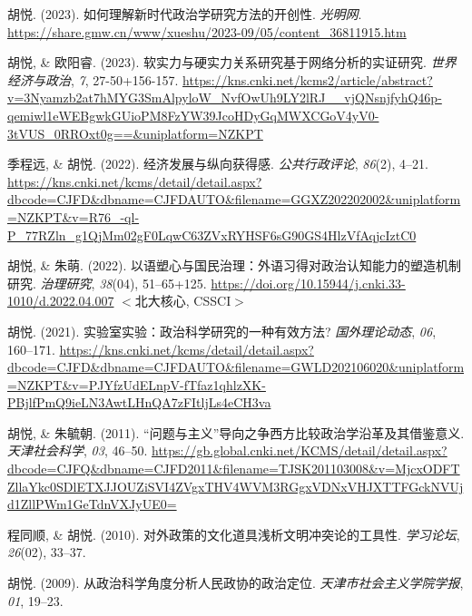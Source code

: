 \documentclass[
  12pt,
]
{article}
\newlength{\cslhangindent}
\newlength{\cslentryspacingunit} %
\newenvironment{CSLReferences}[2] %
 {%
  \setlength{\parindent}{0pt}
  \ifodd #1
  \let\oldpar\par
  \def\par{\hangindent=\cslhangindent\oldpar}
  \fi
  \setlength{\parskip}{#2\cslentryspacingunit}
 }%
 {}
\newcommand{\CSLBlock}[1]{#1\hfill\break}
\begin{document}
\hypertarget{refs-chinese}{}
\begin{CSLReferences}{1}{0}
\leavevmode{}%
胡悦. (2023). {如何理解新时代政治学研究方法的开创性}. \emph{光明网}.
\url{https://share.gmw.cn/www/xueshu/2023-09/05/content_36811915.htm}

\leavevmode{}%
胡悦, \& 欧阳睿. (2023).
{软实力与硬实力关系研究{\textemdash}{\textemdash}基于网络分析的实证研究}.
\emph{世界经济与政治}, \emph{7}, 27-50+156-157.
\url{https://kns.cnki.net/kcms2/article/abstract?v=3Nyamzb2at7hMYG3SmAlpyloW_NvfOwUh9LY2lRJ__vjQNsnjfyhQ46p-qemiwl1eWEBgwkGUioPM8FzYW39JcoHDyGqMWXCGoV4yV0-3tVUS_0RROxt0g==\&uniplatform=NZKPT}

\leavevmode{}%
季程远, \& 胡悦. (2022). 经济发展与纵向获得感. \emph{公共行政评论},
\emph{86}(2), 4--21.
\url{https://kns.cnki.net/kcms/detail/detail.aspx?dbcode=CJFD\&dbname=CJFDAUTO\&filename=GGXZ202202002\&uniplatform=NZKPT\&v=R76_-ql-P_77RZln_g1QjMm02gF0LqwC63ZVxRYHSF6sG90GS4HlzVfAqjcIztC0}

\leavevmode{}%
胡悦, \& 朱萌. (2022).
{以语塑心与国民治理：外语习得对政治认知能力的塑造机制研究}.
\emph{治理研究}, \emph{38}(04), 51--65+125.
\url{https://doi.org/10.15944/j.cnki.33-1010/d.2022.04.007}
\CSLBlock{{\(<\)}北大核心, CSSCI{\(>\)}}

\leavevmode{}%
胡悦. (2021). {实验室实验：政治科学研究的一种有效方法?}
\emph{国外理论动态}, \emph{06}, 160--171.
\url{https://kns.cnki.net/kcms/detail/detail.aspx?dbcode=CJFD\&dbname=CJFDAUTO\&filename=GWLD202106020\&uniplatform=NZKPT\&v=PJYfzUdELnpV-fTfaz1qhlzXK-PBjlfPmQ9ieLN3AwtLHnQA7zFItljLs4eCH3va}

\leavevmode{}%
胡悦, \& 朱毓朝. (2011).
{{``问题与主义''}导向之争{\textemdash}{\textemdash}西方比较政治学沿革及其借鉴意义}.
\emph{天津社会科学}, \emph{03}, 46--50.
\url{https://gb.global.cnki.net/KCMS/detail/detail.aspx?dbcode=CJFQ\&dbname=CJFD2011\&filename=TJSK201103008\&v=MjcxODFTZllaYkc0SDlETXJJOUZiSVI4ZVgxTHV4WVM3RGgxVDNxVHJXTTFGckNVUjd1ZllPWm1GeTdnVXJyUE0=}

\leavevmode{}%
程同顺, \& 胡悦. (2010).
{对外政策的文化道具{\textemdash}{\textemdash}浅析文明冲突论的工具性}.
\emph{学习论坛}, \emph{26}(02), 33--37.

\leavevmode{}%
胡悦. (2009). {从政治科学角度分析人民政协的政治定位}.
\emph{天津市社会主义学院学报}, \emph{01}, 19--23.

\end{CSLReferences}
\end{document}
